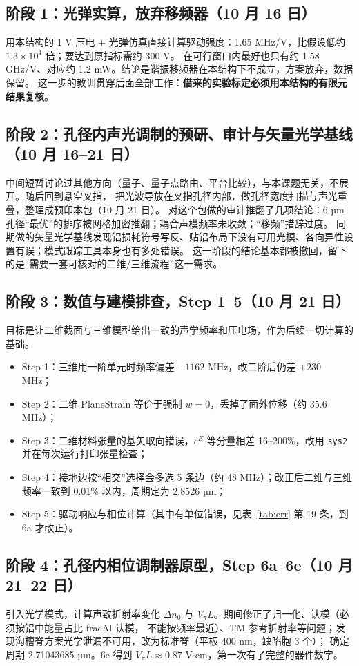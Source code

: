 \documentclass[10pt,a4paper]{article}
\newcommand{\dn}{\Delta n_0}
\begin{document}
\subsection{阶段 1：光弹实算，放弃移频器（10 月 16 日）}
用本结构的 1 V 压电 + 光弹仿真直接计算驱动强度：1.65 MHz/V，比假设低约 $1.3\times10^4$ 倍；要达到原指标需约 300 V。
在可行窗口内最好也只有约 1.58 GHz/V、对应约 1.2 mW。结论是谐振移频器在本结构下不成立，方案放弃，数据保留。
这一步的教训贯穿后面全部工作：\textbf{借来的实验标定必须用本结构的有限元结果复核}。

\subsection{阶段 2：孔径内声光调制的预研、审计与矢量光学基线（10 月 16–21 日）}
中间短暂讨论过其他方向（量子、量子点路由、平台比较），与本课题无关，不展开。随后回到悬空叉指，
把光波导放在叉指孔径内部，做孔径宽度扫描与声光重叠，整理成预印本包（10 月 21 日）。
对这个包做的审计推翻了几项结论：6 µm 孔径“最优”的排序被网格加密推翻；耦合声模频率未收敛；“移频”措辞过度。
同期做的矢量光学基线发现铝损耗符号写反、贴铝布局下没有可用光模、各向异性设置有误；模式跟踪工具本身也有多处错误。
这一阶段的结论基本都被撤回，留下的是“需要一套可核对的二维/三维流程”这一需求。

\subsection{阶段 3：数值与建模排查，Step 1–5（10 月 21 日）}
目标是让二维截面与三维模型给出一致的声学频率和压电场，作为后续一切计算的基础。
\begin{itemize}
\item Step 1：三维用一阶单元时频率偏差 $-1162$ MHz，改二阶后仍差 $+230$ MHz；
\item Step 2：二维 PlaneStrain 等价于强制 $w=0$，丢掉了面外位移（约 35.6 MHz）；
\item Step 3：二维材料张量的基矢取向错误，$c^E$ 等分量相差 16–200\%，改用 \texttt{sys2} 并在每次运行打印张量检查；
\item Step 4：接地边按“相交”选择会多选 5 条边（约 48 MHz）；改正后二维与三维频率一致到 0.01\% 以内，周期定为 2.8526 µm；
\item Step 5：驱动响应与相位计算（其中有单位错误，见表~\ref{tab:err} 第 19 条，到 6a 才改正）。
\end{itemize}

\subsection{阶段 4：孔径内相位调制器原型，Step 6a–6e（10 月 21–22 日）}
引入光学模式，计算声致折射率变化 $\dn$ 与 $V_\pi L$。期间修正了归一化、认模（必须按铝中能量占比 fracAl 认模，
不能按频率最近）、TM 参考折射率等问题；发现沟槽脊方案光学泄漏不可用，改为标准脊（平板 400 nm，缺陷胞 3 个）；
确定周期 2.71043685 µm。6e 得到 $V_\pi L \approx 0.87$ V$\cdot$cm，第一次有了完整的器件数字。
\end{document}
